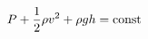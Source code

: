 \documentclass[preview]{standalone}
\begin{document}
\begin{align*}
\special{dvisvgm:raw <g id='unique000'>}P + \frac{1}{2}\rho v^2 + \rho gh = \text{const}\special{dvisvgm:raw </g>}
\end{align*}
\end{document}
